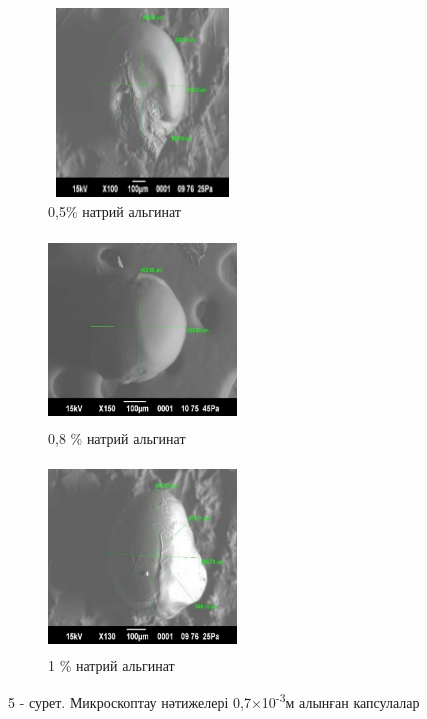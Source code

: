 \begin{figure}[H]
	\centering
	\begin{subfigure}[b]{0.3\textwidth}
		\centering
		\includegraphics[height=5cm,width=5cm]{media/pish/image26}
		\caption*{0,5\% натрий альгинат}
	\end{subfigure}
	\hfill
	\begin{subfigure}[b]{0.3\textwidth}
		\centering
		\includegraphics[height=5cm,width=5cm]{media/pish/image27}
		\caption*{0,8 \% натрий альгинат}
	\end{subfigure}
	\hfill
	\begin{subfigure}[b]{0.3\textwidth}
		\centering
		\includegraphics[height=5cm,width=5cm]{media/pish/image28}
		\caption*{1 \% натрий альгинат}
	\end{subfigure}
	\caption*{5 - сурет. Микроскоптау нәтижелері 0,7×10\textsuperscript{-3}м алынған капсулалар}
\end{figure}

